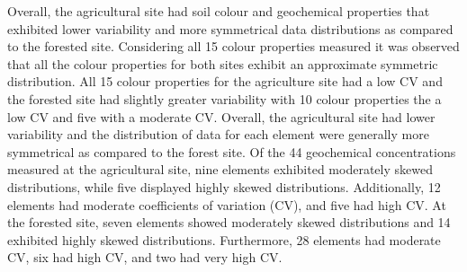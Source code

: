 \documentclass[
  number]{elsarticle}
\begin{document}
Overall, the agricultural site had soil colour and geochemical
properties that exhibited lower variability and more symmetrical data
distributions as compared to the forested site. Considering all 15
colour properties measured it was observed that all the colour
properties for both sites exhibit an approximate symmetric distribution.
All 15 colour properties for the agriculture site had a low CV and the
forested site had slightly greater variability with 10 colour properties
the a low CV and five with a moderate CV. Overall, the agricultural site
had lower variability and the distribution of data for each element were
generally more symmetrical as compared to the forest site. Of the 44
geochemical concentrations measured at the agricultural site, nine
elements exhibited moderately skewed distributions, while five displayed
highly skewed distributions. Additionally, 12 elements had moderate
coefficients of variation (CV), and five had high CV. At the forested
site, seven elements showed moderately skewed distributions and 14
exhibited highly skewed distributions. Furthermore, 28 elements had
moderate CV, six had high CV, and two had very high CV.
\end{document}
